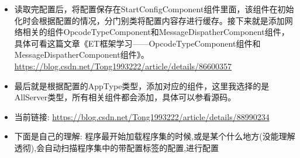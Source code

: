 \documentclass[9pt, b5paper]{article}
\begin{document}
\begin{itemize}
\item 读取完配置后，将配置保存在StartConfigComponent组件里面，该组件在初始化时会根据配置的情况，分门别类将配置内容存进行缓存。接下来就是添加网络相关的组件OpcodeTypeComponent和MessageDispatherComponent组件，具体可看这篇文章《ET框架学习——OpcodeTypeComponent组件和MessageDispatherComponent组件》。\url{https://blog.csdn.net/Tong1993222/article/details/86600357}
\item 最后就是根据配置的AppType类型，添加对应的组件，这里我选择的是AllServer类型，所有相关组件都会添加，具体可以参看源码。
\item 当前链接: \url{https://blog.csdn.net/Tong1993222/article/details/88990234}
\item 下面是自己的理解: 程序最开始加载程序集的时候,或是某个什么地方(没能理解透彻),会自动扫描程序集中的带配置标签的配置,进行配置
\end{itemize}
\end{document}

